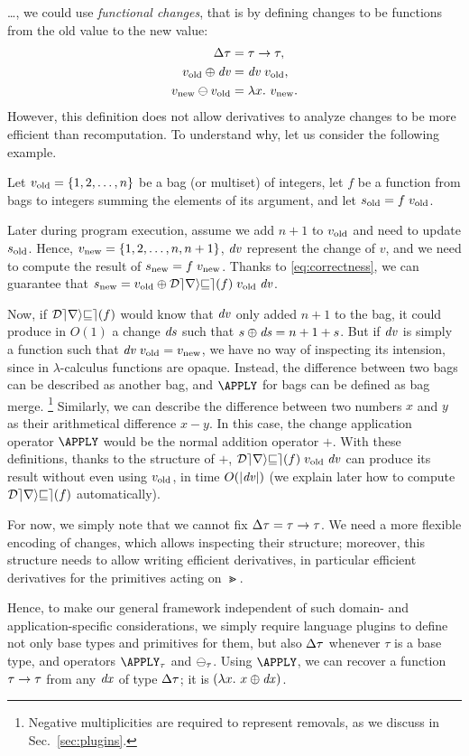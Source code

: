 \begin{oldSec}

\ldots, we could use \emph{functional
changes}, that is by defining changes to be functions from the
old value to the new value:
\begin{align*}
\Change{\Gt} & = \Gt \r \Gt, \\
\Apply{\D v}{\Old{v}} & = \App{\D v}{\Old{v}},\\
\Diff{\New{v}}{\Old{v}} & = \Lam{x}{\New{v}}.
\end{align*}
However,
this definition does not allow derivatives to analyze changes to
be more efficient than recomputation. To understand why, let us
consider the following example.

Let $v_{\textrm{old}} = \{1, 2, \ldots, n\}$ be a bag (or multiset) of
integers, let $f$ be a function from bags to integers summing the
elements of its argument, and let $\Old{s} = \App{f}{\Old{v}}$.

Later during program execution, assume we add $n + 1$ to
$v_{\textrm{old}}$ and need to update $s_{\textrm{old}}$. Hence,
 $v_{\textrm{new}} = \{1, 2, \ldots, n, n + 1\}$, $\mathit{dv}$ represent the change of $v$,
and we need to compute the result of $\New{s} = \App{f}{\New{v}}$.
%
Thanks to \cref{eq:correctness}, we can guarantee that
$\New{s} = \Apply{\App{\App{\Derive{f}}{\Old{v}}}{\D
    v}}{\Old{v}}$.

Now, if $\Derive{f}$ would know that $\mathit{dv}$ only added $n + 1$ to
the bag, it could produce in $O(1)$ a change $\mathit{ds}$ such that
$\Apply{\D s}{s} = n + 1 + s$. But if $\mathit{dv}$ is simply a function
such that $\App{\D v}{\Old{v}} = \New{v}$, we have no way of
inspecting its intension, since in $\lambda$-calculus functions
are opaque. Instead, the difference between two bags can be
described as another bag, and $\APPLY$ for bags can be defined as
bag merge.%
\footnote{Negative multiplicities are required to represent
  removals, as we discuss in Sec.~\ref{sec:plugins}.} Similarly,
we can describe the difference between two numbers $x$ and $y$ as
their arithmetical difference $x-y$. In this case, the change
application operator $\APPLY$ would be the normal addition
operator $+$. With these definitions, thanks to the structure of
$+$, $\App{\App{\Derive{f}}{\Old{v}}}{\D v}$ can produce its
result without even using $v_{\textrm{old}}$, in time $O(|\mathit{dv}|)$ (we
explain later how to compute $\Derive{f}$ automatically).

For now, we simply note that we cannot fix $\Change{\Gt} = \Gt \r
\Gt$. We need a more flexible encoding of changes, which allows
inspecting their structure; moreover, this structure needs to
allow writing efficient derivatives, in particular efficient
derivatives for the primitives acting on $\Gt$.

Hence, to make our general framework
independent of such domain- and application-specific
considerations, we simply require language plugins to define not
only base types and primitives for them, but also $\Change{\tau}$
whenever $\tau$ is a base type, and operators $\APPLY_\tau$ and
$\DIFF_\tau$.
Using $\APPLY$, we can recover a function $\tau\to\tau$
from any $\mathit{dx}$ of type $\Change{\Gt}$; it is $\Lam*x{\Apply{\D
x}{x}}$.
\end{oldSec}

